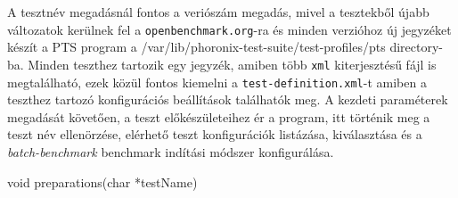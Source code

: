 A tesztnév megadásnál fontos a veriószám megadás, mivel a tesztekből újabb változatok kerülnek fel a \texttt{openbenchmark.org}-ra és minden verzióhoz új jegyzéket készít a PTS program a /var/lib/phoronix-test-suite/test-profiles/pts directory-ba.
Minden teszthez tartozik egy jegyzék, amiben több \texttt{xml} kiterjesztésű fájl is megtalálható, ezek közül fontos kiemelni a \texttt{test-definition.xml}-t amiben a teszthez tartozó konfigurációs beállítások találhatók meg.
A kezdeti paraméterek megadását követően, a teszt előkészületeihez ér a program, itt történik meg a teszt név ellenörzése, elérhető teszt konfigurációk listázása, kiválasztása és a \textit{batch-benchmark} benchmark indítási módszer konfigurálása. 

\begin{cpp}
void preparations(char *testName)
\end{cpp}

